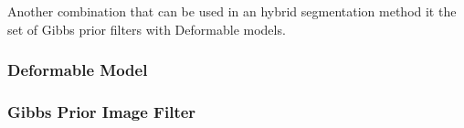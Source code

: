 Another combination that can be used in an hybrid segmentation method it the
set of Gibbs prior filters with Deformable models.

\subsubsection{Deformable Model}



\subsubsection{Gibbs Prior Image Filter}


